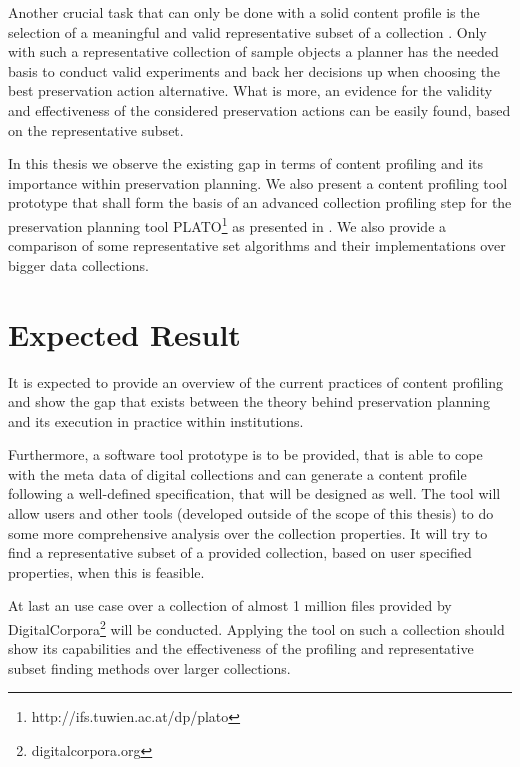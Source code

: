 \documentclass[a4paper,12pt]{scrartcl} %
\begin{document}
Another crucial task that can only be done with a solid content profile is the selection of a meaningful and valid representative subset of a collection \cite{kulovits08:16[TUW-172761]}. Only with such a representative collection of sample objects a planner 
has the needed basis to conduct valid experiments and back her decisions up when choosing the best
preservation action alternative. What is more, an evidence for the validity and effectiveness of the considered preservation actions can be easily found, based on the representative subset.

In this thesis we observe the existing gap in terms of content profiling and its importance within preservation
planning. We also present a content profiling tool prototype that shall form the basis of an advanced collection profiling step for the preservation planning tool PLATO\footnote{http://ifs.tuwien.ac.at/dp/plato} as presented in \cite{Becker:2008:PSO:1378889.1378954}. We also provide a comparison of some representative
set algorithms and their implementations over bigger data collections.

\section*{Expected Result}
It is expected to provide an overview of the current practices of content profiling and show the gap that exists between the theory behind preservation planning and its execution in practice within institutions. 

Furthermore, a software tool prototype is to be provided, that is able to cope with the meta data of digital collections and can generate a content profile following a well-defined specification, that will be designed as well. The tool will allow users and other tools (developed outside of the scope of this thesis) to do some more comprehensive analysis over the collection properties. It will try to find a representative subset of a provided collection, based on user specified properties, when this is feasible.

At last an use case over a collection of almost 1 million files provided by DigitalCorpora\footnote{digitalcorpora.org} will be conducted. Applying the tool on such a collection should show its capabilities and the effectiveness of the profiling and representative subset finding methods over larger collections.
\end{document}
